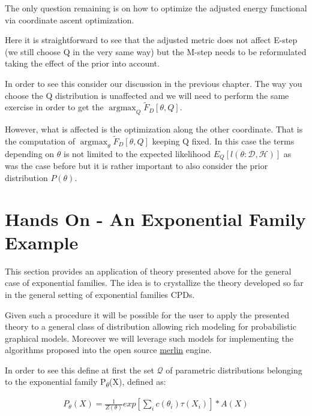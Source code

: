 \documentclass[11pt]{article}
\begin{document}
\begin{article}
The only question remaining is on how to optimize the adjusted
energy functional via coordinate ascent optimization.

Here it is straightforward to see that the adjusted metric does not
affect E-step (we still choose Q in the very same way) but the
M-step needs to be reformulated taking the effect of the prior into
account.

In order to see this consider our discussion in the previous
chapter. The way you choose the Q distribution is unaffected and
we will need to perform the same exercise in order to get the
\(\operatorname*{argmax}_{Q} \tilde{F}_D[\theta, Q]\).

However, what is affected is the optimization along the other
coordinate. That is the computation of
\(\operatorname*{argmax}_{\theta} \tilde{F}_D[\theta, Q]\) keeping Q
fixed. In this case the terms depending on \(\theta\) is not limited to
the expected likelihood \(E_Q[l (\theta: \mathscr{D}, \mathscr{H})]\)
as was the case before but it is rather important to also consider
the prior distribution \(P(\theta)\).





\newpage

\section{Hands On - An Exponential Family Example}
\label{sec:org9338051}

This section provides an application of theory presented above for
the general case of exponential families. The idea is to
crystallize the theory developed so far in the general setting of
exponential families CPDs.

Given such a procedure it will be possible for the user to apply
the presented theory to a general class of distribution allowing
rich modeling for probabilistic graphical models. Moreover we will
leverage such models for implementing the algorithms proposed into
the open source \href{https://github.com/radum2275/merlin}{merlin} engine. 

In order to see this define at first the set \(\mathscr{Q}\) of
parametric distributions belonging to the exponential family
P\textsubscript{\(\theta\)}(X), defined as:

\begin{align} \label{eq:exponential-family}
P_{\theta}(X) = \frac{1}{Z(\theta)} exp[\sum_i c(\theta_i)\tau(X_i)] * A(X)
\end{align}


\end{article}
\end{document}
